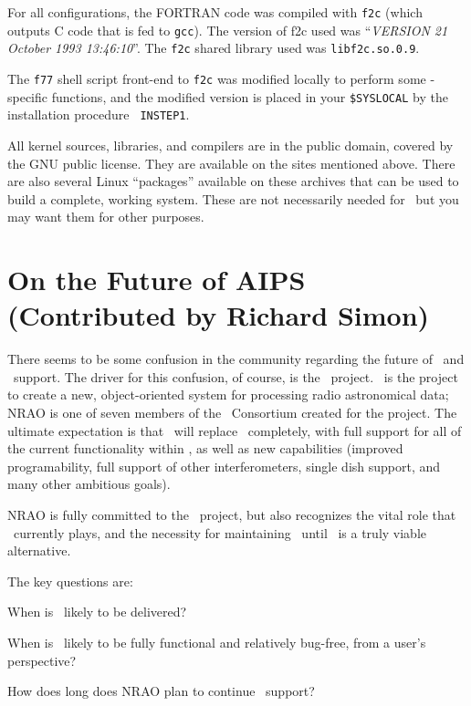 For all configurations, the FORTRAN code was compiled with {\tt f2c}
(which outputs C code that is fed to {\tt gcc}).  The version of f2c
used was ``{\it VERSION 21 October 1993  13:46:10\/}''.  The {\tt f2c}
shared library used was {\tt libf2c.so.0.9}.

The {\tt f77} shell script front-end to {\tt f2c} was modified locally
to perform some \AIPS -specific functions, and the modified version is
placed in your {\tt\$SYSLOCAL} by the installation procedure {\tt
INSTEP1}.

All kernel sources, libraries, and compilers are in the public domain,
covered by the GNU public license.  They are available on the sites
mentioned above.  There are also several Linux ``packages'' available
on these archives that can be used to build a complete, working
system.  These are not necessarily needed for \AIPS\ but you may want
them for other purposes.

\section{On the Future of AIPS (Contributed by Richard Simon)}

There seems to be some confusion in the community regarding the future
of \AIPS\ and \AIPS\ support.  The driver for this confusion, of
course, is the \AIPTOO\ project.  \AIPTOO\ is the project to create a
new, object-oriented system for processing radio astronomical data;
NRAO is one of seven members of the \AIPTOO\ Consortium created for
the project.  The ultimate expectation is that \AIPTOO\ will replace
\AIPS\ completely, with full support for all of the current
functionality within \AIPS, as well as new capabilities (improved
programability, full support of other interferometers, single dish
support, and many other ambitious goals).

NRAO is fully committed to the \AIPTOO\ project, but also recognizes
the vital role that \AIPS\ currently plays, and the necessity for
maintaining \AIPS\ until \AIPTOO\ is a truly viable alternative.

The key questions are:
\begin{description}
\bulitem When is \AIPTOO\ likely to be delivered?

\bulitem When is \AIPTOO\ likely to be fully functional and relatively
         bug-free, from a user's perspective?

\bulitem How does long does NRAO plan to continue \AIPS\ support?
\end{description}

